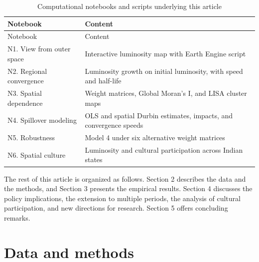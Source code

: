 \documentclass[
  a4paper, 
  twoside,
  final
]{article}
\begin{document}
\begin{longtable}[]{@{}
  >{\raggedright\arraybackslash}p{}
  >{\raggedright\arraybackslash}p{}@{}}
\caption{Computational notebooks and scripts underlying this
article}\label{tbl-notebooks}\tabularnewline
\toprule\noalign{}
\begin{minipage}[b]{\linewidth}\raggedright
Notebook
\end{minipage} & \begin{minipage}[b]{\linewidth}\raggedright
Content
\end{minipage} \\
\midrule\noalign{}
\endfirsthead
\toprule\noalign{}
\begin{minipage}[b]{\linewidth}\raggedright
Notebook
\end{minipage} & \begin{minipage}[b]{\linewidth}\raggedright
Content
\end{minipage} \\
\midrule\noalign{}
\endhead
\bottomrule\noalign{}
\endlastfoot
N1. View from outer space & Interactive luminosity map with Earth Engine
script \\
N2. Regional convergence & Luminosity growth on initial luminosity, with
speed and half-life \\
N3. Spatial dependence & Weight matrices, Global Moran's I, and LISA
cluster maps \\
N4. Spillover modeling & OLS and spatial Durbin estimates, impacts, and
convergence speeds \\
N5. Robustness & Model 4 under six alternative weight matrices \\
N6. Spatial culture & Luminosity and cultural participation across
Indian states \\
\end{longtable}

The rest of this article is organized as follows. Section 2 describes
the data and the methods, and Section 3 presents the empirical results.
Section 4 discusses the policy implications, the extension to multiple
periods, the analysis of cultural participation, and new directions for
research. Section 5 offers concluding remarks.

\section{Data and methods}\label{data-and-methods}
\end{document}
